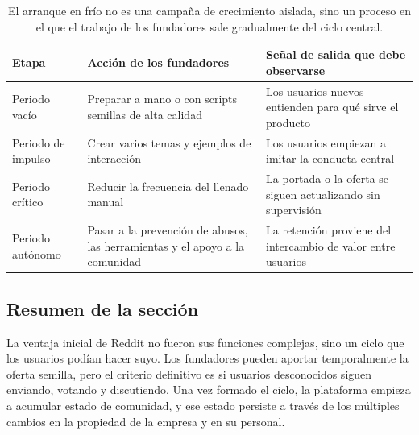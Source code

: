 \begin{table}[H]
\centering
\begin{tabular}{L{0.2\textwidth}L{0.31\textwidth}L{0.39\textwidth}}
\toprule
Etapa & Acción de los fundadores & Señal de salida que debe observarse \\
\midrule
Periodo vacío & Preparar a mano o con scripts semillas de alta calidad & Los usuarios nuevos entienden para qué sirve el producto \\
Periodo de impulso & Crear varios temas y ejemplos de interacción & Los usuarios empiezan a imitar la conducta central \\
Periodo crítico & Reducir la frecuencia del llenado manual & La portada o la oferta se siguen actualizando sin supervisión \\
Periodo autónomo & Pasar a la prevención de abusos, las herramientas y el apoyo a la comunidad & La retención proviene del intercambio de valor entre usuarios \\
\bottomrule
\end{tabular}
\caption{El arranque en frío no es una campaña de crecimiento aislada, sino un proceso en el que el trabajo de los fundadores sale gradualmente del ciclo central.}
\end{table}

\subsection{Resumen de la sección}

La ventaja inicial de Reddit no fueron sus funciones complejas, sino un ciclo que los usuarios podían hacer suyo. Los fundadores pueden aportar temporalmente la oferta semilla, pero el criterio definitivo es si usuarios desconocidos siguen enviando, votando y discutiendo. Una vez formado el ciclo, la plataforma empieza a acumular estado de comunidad, y ese estado persiste a través de los múltiples cambios en la propiedad de la empresa y en su personal.
